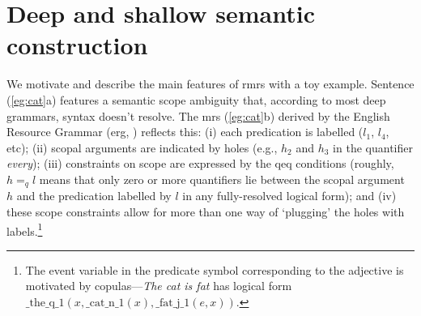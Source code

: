 \section{Deep and shallow semantic construction}
\label{sec:motivation}

%

We motivate and describe the main features of {\sc rmrs} with a toy
example.  Sentence 
(\ref{eg:cat}a) features a semantic scope ambiguity that, according to
most deep grammars, syntax
doesn't resolve.    The {\sc mrs} (\ref{eg:cat}b) derived by the
English Resource Grammar ({\sc erg}, \cite{copestake:flickinger:2000})
reflects this: (i) each predication is
labelled ($l_1$, $l_4$, etc); (ii) scopal arguments are indicated by
holes (e.g., $h_2$ and $h_3$ in the quantifier {\em every}); (iii)
constraints on scope are expressed by the qeq conditions (roughly, $h
=_q l$ means that only zero or more quantifiers lie between the scopal
argument $h$ and the predication labelled by $l$ in any fully-resolved
logical form); and (iv) these scope
constraints allow for more than one way of `plugging' the holes with
labels.\footnote{The event variable in the predicate symbol
  corresponding to the adjective is motivated by copulas---{\em The
    cat is fat} has logical form 
  $\mbox{\_the\_q\_1}(x,\mbox{\_cat\_n\_1}(x),\mbox{\_fat\_j\_1}(e,x))$.}
